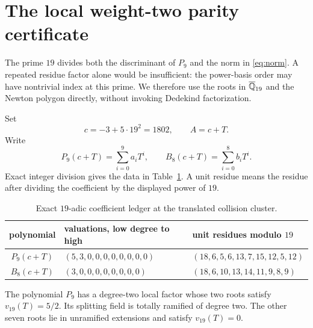 \section{The local weight-two parity certificate}

The prime \(19\) divides both the discriminant of \(P_9\) and the norm in
\eqref{eq:norm}.  A repeated residue factor alone would be insufficient:
the power-basis order may have nontrivial index at this prime.  We therefore
use the roots in \(\overline{\mathbb{Q}}_{19}\) and the Newton polygon directly,
without invoking Dedekind factorization.

Set
\begin{equation}
 c=-3+5\cdot19^2=1802,
 \qquad A=c+T.                                              \label{eq:shift}
\end{equation}
Write
\[
 P_9(c+T)=\sum_{i=0}^{9}a_iT^i,
 \qquad B_8(c+T)=\sum_{i=0}^{8}b_iT^i.
\]
Exact integer division gives the data in Table~\ref{tab:newton}.  A unit
residue means the residue after dividing the coefficient by the displayed
power of \(19\).

\begin{table}[h]
\centering
\small
\begin{tabular}{c@{\qquad}l@{\qquad}l}
\toprule
polynomial & valuations, low degree to high & unit residues modulo \(19\) \\
\midrule
\(P_9(c+T)\) & \((5,3,0,0,0,0,0,0,0,0)\)
 & \((18,6,5,6,13,7,15,12,5,12)\) \\
\(B_8(c+T)\) & \((3,0,0,0,0,0,0,0,0)\)
 & \((18,6,10,13,14,11,9,8,9)\) \\
\bottomrule
\end{tabular}
\caption{Exact \(19\)-adic coefficient ledger at the translated collision
cluster.}
\label{tab:newton}
\end{table}

\begin{lemma}\label{lem:cluster}
The polynomial \(P_9\) has a degree-two local factor whose two roots satisfy
\(v_{19}(T)=5/2\).  Its splitting field is totally ramified of degree two.
The other seven roots lie in unramified extensions and satisfy
\(v_{19}(T)=0\).
\end{lemma}

